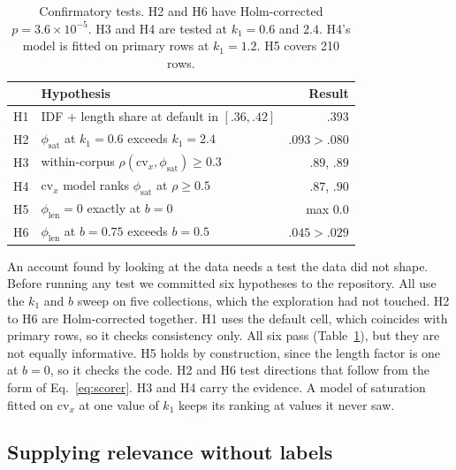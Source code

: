 \documentclass[11pt]{article}
\begin{document}
\begin{table}[t]
\centering
\small
\setlength{\tabcolsep}{3pt}
\begin{tabular}{@{}llr@{}}
\toprule
 & Hypothesis & Result \\
\midrule
H1 & IDF + length share at default in $[.36, .42]$ & $.393$ \\
H2 & $\phi_{\mathrm{sat}}$ at $k_1 = 0.6$ exceeds $k_1 = 2.4$ & $.093 > .080$ \\
H3 & within-corpus $\rho(\mathrm{cv}_x, \phi_{\mathrm{sat}}) \ge 0.3$ & $.89$, $.89$ \\
H4 & $\mathrm{cv}_x$ model ranks $\phi_{\mathrm{sat}}$ at $\rho \ge 0.5$ & $.87$, $.90$ \\
H5 & $\phi_{\mathrm{len}} = 0$ exactly at $b = 0$ & max $0.0$ \\
H6 & $\phi_{\mathrm{len}}$ at $b = 0.75$ exceeds $b = 0.5$ & $.045 > .029$ \\
\bottomrule
\end{tabular}
\caption{Confirmatory tests. H2 and H6 have Holm-corrected $p = 3.6\times10^{-5}$. H3 and
H4 are tested at $k_1 = 0.6$ and $2.4$. H4's model is fitted on primary rows at
$k_1 = 1.2$. H5 covers 210 rows.}
\label{tab:confirm}
\end{table}

An account found by looking at the data needs a test the data did not shape. Before
running any test we committed six hypotheses to the repository. All use the $k_1$ and $b$
sweep on five collections, which the exploration had not touched. H2 to H6 are Holm-corrected together. H1
uses the default cell, which coincides with primary rows, so it checks consistency only.
All six pass (Table~\ref{tab:confirm}), but they are not equally informative. H5 holds by
construction, since the length factor is one at $b = 0$, so it checks the code. H2 and H6
test directions that follow from the form of Eq.~\eqref{eq:scorer}. H3 and H4 carry the
evidence. A model of saturation fitted on $\mathrm{cv}_x$ at one value of $k_1$ keeps its
ranking at values it never saw.

\subsection{Supplying relevance without labels}
\end{document}
